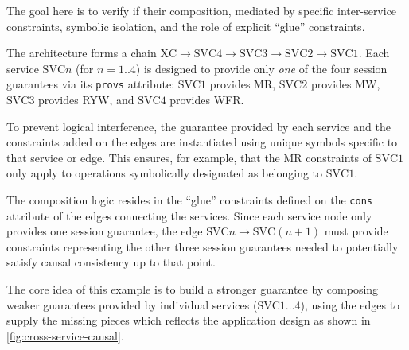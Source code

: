 
The goal here is to verify if their composition, mediated by specific
inter-service
constraints, symbolic isolation, and the role of explicit ``glue'' constraints.

 The architecture forms a chain $\text{XC} \rightarrow
\text{SVC4} \rightarrow \text{SVC3} \rightarrow \text{SVC2}
\rightarrow \text{SVC1}$.
Each service $\text{SVC}n$ (for $n=1..4$) is designed to provide only
\textit{one} of the
four session guarantees via its \texttt{provs} attribute:
$\text{SVC}1$ provides MR, $\text{SVC}2$ provides
MW, $\text{SVC}3$ provides RYW, and $\text{SVC}4$ provides WFR.

To prevent logical interference, the guarantee provided by
each service and the constraints added on the edges are instantiated
using unique
symbols specific to that service or edge.
This ensures, for example, that the MR constraints of
$\text{SVC}1$ only apply to operations symbolically designated as belonging to
$\text{SVC}1$.

The composition logic resides in the ``glue''
constraints defined on the \texttt{cons} attribute of the edges connecting the
services. Since each service node only provides one session
guarantee, the edge $\text{SVC}n \rightarrow \text{SVC}(n+1)$ must
provide constraints representing the other three session guarantees needed to
potentially satisfy causal consistency up to that point.

The core idea of this example is to build a stronger guarantee by composing
weaker guarantees provided by individual services ($\text{SVC}1
\ldots 4$), using
the edges to supply the missing pieces which reflects the application design
as shown in \cref{fig:cross-service-causal}.

